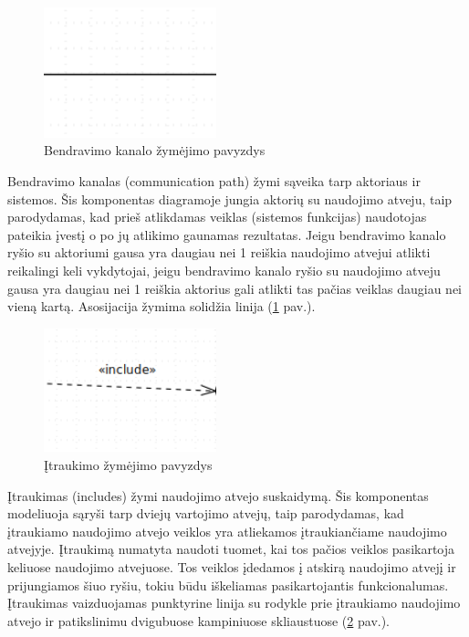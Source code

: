 \documentclass{VUMIFInfBakalaurinis}
\begin{document}
\begin{figure}[H]
	\centering
	\includegraphics[width=5cm]{img/use_case_components/association}
	\caption{Bendravimo kanalo žymėjimo pavyzdys}
	\label{img:use_case_components_communication_path}
\end{figure}

Bendravimo kanalas (communication path) žymi sąveika tarp aktoriaus ir sistemos. Šis komponentas diagramoje jungia aktorių su naudojimo atveju, taip parodydamas, kad prieš atlikdamas veiklas (sistemos funkcijas) naudotojas pateikia įvestį o po jų atlikimo gaunamas rezultatas. Jeigu bendravimo kanalo ryšio su aktoriumi gausa yra daugiau nei 1 reiškia naudojimo atvejui atlikti reikalingi keli vykdytojai, jeigu bendravimo kanalo ryšio su naudojimo atveju gausa yra daugiau nei 1 reiškia aktorius gali atlikti tas pačias veiklas daugiau nei vieną kartą. Asosijacija žymima solidžia linija (\ref{img:use_case_components_communication_path} pav.).

\begin{figure}[H]
	\centering
	\includegraphics[width=5cm]{img/use_case_components/includes}
	\caption{Įtraukimo žymėjimo pavyzdys}
	\label{img:use_case_components_includes}
\end{figure}

Įtraukimas (includes) žymi naudojimo atvejo suskaidymą. Šis komponentas modeliuoja sąryši tarp dviejų vartojimo atvejų, taip parodydamas, kad įtraukiamo naudojimo atvejo veiklos yra atliekamos įtraukiančiame naudojimo atvejyje. Įtraukimą numatyta naudoti tuomet, kai tos pačios veiklos pasikartoja keliuose naudojimo atvejuose. Tos veiklos įdedamos į atskirą naudojimo atvejį ir prijungiamos šiuo ryšiu, tokiu būdu iškeliamas pasikartojantis funkcionalumas. Įtraukimas vaizduojamas punktyrine linija su rodykle  prie įtraukiamo naudojimo atvejo ir patikslinimu dvigubuose kampiniuose skliaustuose (\ref{img:use_case_components_includes} pav.).
\end{document}
